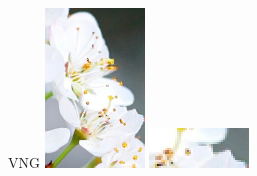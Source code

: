 \begin{figure}[H]
\begin{minipage}{0.19\textwidth}
    \end{minipage}
    \hfill
    \begin{minipage}{0.19\textwidth}
        \centering
        VNG 
        \includegraphics[width=\textwidth]{img/flower/flower-vng.png}
        \includegraphics[width=\textwidth]{img/flower/flower-close-vng.png}

\end{minipage}
\end{figure}
